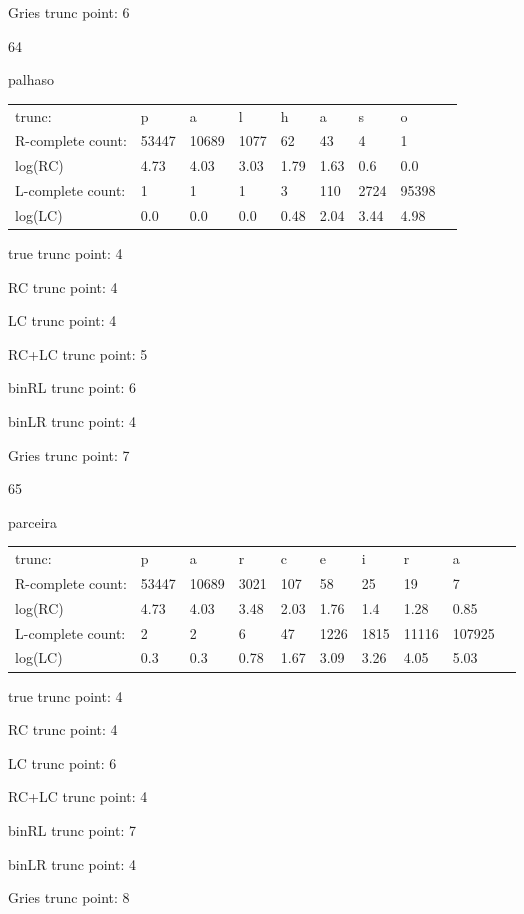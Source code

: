 \documentclass[10pt]{article}
\begin{document}
Gries trunc point: 6

\vspace{1em}

64

palhaso

\begin{tabular}{l|llllllll}
trunc: & p & a & l & h & a & s & o & \\ 
R-complete count: & 53447 & 10689 & 1077 & 62 & 43 & 4 & 1 & \\ 
log(RC) & 4.73 & 4.03 & 3.03 & 1.79 & 1.63 & 0.6 & 0.0 & \\ 
L-complete count: & 1 & 1 & 1 & 3 & 110 & 2724 & 95398 & \\ 
log(LC) & 0.0 & 0.0 & 0.0 & 0.48 & 2.04 & 3.44 & 4.98 & \\ 
\end{tabular}

true trunc point: 4

RC trunc point: 4

LC trunc point: 4

RC+LC trunc point: 5

binRL trunc point: 6

binLR trunc point: 4

Gries trunc point: 7

\newpage

65

parceira

\begin{tabular}{l|lllllllll}
trunc: & p & a & r & c & e & i & r & a & \\ 
R-complete count: & 53447 & 10689 & 3021 & 107 & 58 & 25 & 19 & 7 & \\ 
log(RC) & 4.73 & 4.03 & 3.48 & 2.03 & 1.76 & 1.4 & 1.28 & 0.85 & \\ 
L-complete count: & 2 & 2 & 6 & 47 & 1226 & 1815 & 11116 & 107925 & \\ 
log(LC) & 0.3 & 0.3 & 0.78 & 1.67 & 3.09 & 3.26 & 4.05 & 5.03 & \\ 
\end{tabular}

true trunc point: 4

RC trunc point: 4

LC trunc point: 6

RC+LC trunc point: 4

binRL trunc point: 7

binLR trunc point: 4

Gries trunc point: 8

\vspace{1em}
\end{document}
